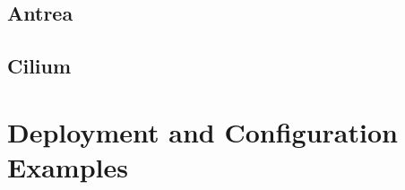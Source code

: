 \subsection{Antrea}
\label{sec:antrea_egress_gateway}

\subsection{Cilium}
\label{sec:cilium_egress_gateway}



\section{Deployment and Configuration Examples}
\label{sec:deploy_egress}
